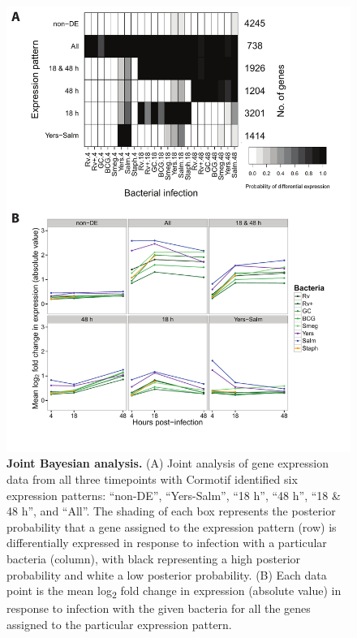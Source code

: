 \begin{figure}
\centering \includegraphics[width=5in]{img/ch02/fig-02-joint-all.pdf}
\caption[Joint Bayesian analysis.]{\textbf{Joint Bayesian analysis.}
  (A) Joint analysis of gene expression data from all three timepoints
  with Cormotif \citep{Wei2015} identified six expression patterns:
  ``non-DE'', ``Yers-Salm'', ``18 h'', ``48 h'', ``18 \& 48 h'', and
  ``All''. The shading of each box represents the posterior
  probability that a gene assigned to the expression pattern (row) is
  differentially expressed in response to infection with a particular
  bacteria (column), with black representing a high posterior
  probability and white a low posterior probability. (B) Each data
  point is the mean log\textsubscript{2} fold change in expression
  (absolute value) in response to infection with the given bacteria
  for all the genes assigned to the particular expression pattern.}
\label{fig:joint-all}
\end{figure}

